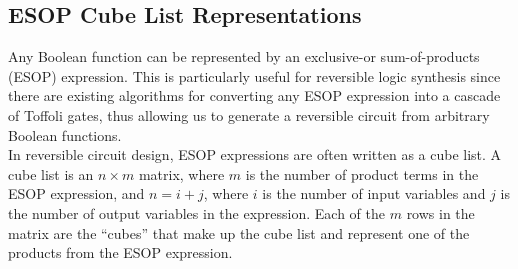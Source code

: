 \subsection{ESOP Cube List Representations}

Any Boolean function can be represented by an exclusive-or sum-of-products (ESOP) expression. This is particularly useful for reversible logic synthesis since there are existing algorithms for converting any ESOP expression into a cascade of Toffoli gates, thus allowing us to generate a reversible circuit from arbitrary Boolean functions. \\ 


In reversible circuit design, ESOP expressions are often written as a cube list. A cube list is an $ n \times m $ matrix, where $m$ is the number of product terms in the ESOP expression, and $n = i + j$, where $i$ is the number of input variables and $j$ is the number of output variables in the expression. Each of the $m$ rows in the matrix are the ``cubes'' that make up the cube list and represent one of the products from the ESOP expression. \\

